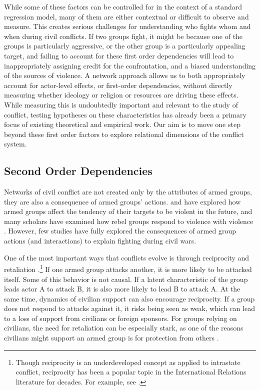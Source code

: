 While some of these factors can be controlled for in the context of a standard regression model, many of them are either contextual or difficult to observe and measure. This creates serious challenges for understanding who fights whom and when during civil conflicts. If two groups fight, it might be because one of the groups is particularly aggressive, or the other group is a particularly appealing target, and failing to account for these first order dependencies will lead to inappropriately assigning credit for the confrontation, and a biased understanding of the sources of violence. A network approach allows us to both appropriately account for actor-level effects, or first-order dependencies, without directly measuring whether ideology or religion or resources are driving these effects. While measuring this is undoubtedly important and relevant to the study of conflict, testing hypotheses on these characteristics has already been a primary focus of existing theoretical and empirical work. Our aim is to move one step beyond these first order factors to explore relational dimensions of the conflict system.

\subsection*{Second Order Dependencies}

Networks of civil conflict are not created only by the attributes of armed groups, they are also a consequence of armed groups' actions.  \citet{condra:shapiro:2012} and \citet{lyall:2009b} have explored how armed groups affect the tendency of their targets to be violent in the future, and many scholars have examined how rebel groups respond to violence with violence \citep{kathman:wood:2015}. However, few studies have fully explored the consequences of armed group actions (and interactions) to explain fighting during civil wars.

One of the most important ways that conflicts evolve is through reciprocity and retaliation \citep{moore:1995}.\footnote{Though reciprocity is an underdeveloped concept as applied to intrastate conflict, reciprocity has been a popular topic in the International Relations literature for decades. For example, see \cite{richardson:1960, dorff:minhas:2017}.} If one armed group attacks another, it is more likely to be attacked itself. Some of this behavior is not causal. If a latent characteristic of the group leads actor A to attack B, it is also more likely to lead B to attack A. At the same time, dynamics of civilian support can also encourage reciprocity. If a group does not respond to attacks against it, it risks being seen as weak, which can lead to a loss of support from civilians or foreign sponsors. For groups relying on civilians, the need for retaliation can be especially stark, as one of the reasons civilians might support an armed group is for protection from others \citep{kalyvas:2006, valentino:etal:2004}.


